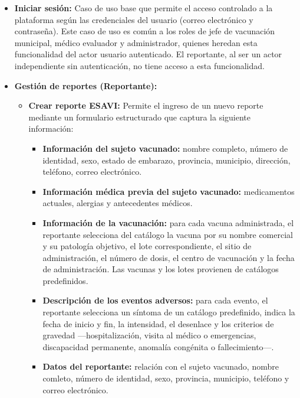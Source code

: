 \begin{itemize} 
    \item \textbf{Iniciar sesión:} Caso de uso base que permite el acceso controlado a la plataforma según las credenciales del usuario (correo electrónico y contraseña). 
    Este caso de uso es común a los roles de jefe de vacunación municipal, médico evaluador y administrador, quienes heredan esta funcionalidad del actor usuario autenticado. 
    El reportante, al ser un actor independiente sin autenticación, no tiene acceso a esta funcionalidad.

    \item \textbf{Gestión de reportes (Reportante):}
        \begin{itemize}
            \item \textbf{Crear reporte ESAVI:} Permite el ingreso de un nuevo reporte mediante un formulario estructurado que captura la siguiente información:
                    
                \begin{itemize}
                    \item \textbf{Información del sujeto vacunado:} nombre completo, número de identidad, sexo, estado de embarazo, provincia, municipio, dirección, teléfono, correo electrónico.
                    \item \textbf{Información médica previa del sujeto vacunado:} medicamentos actuales, alergias y antecedentes médicos.
                    \item \textbf{Información de la vacunación:} para cada vacuna administrada, el reportante selecciona del catálogo la vacuna por su nombre comercial y su patología objetivo, el lote correspondiente, el sitio de administración, el número de dosis, el centro de vacunación y la fecha de administración. Las vacunas y los lotes provienen de catálogos predefinidos.
                    \item \textbf{Descripción de los eventos adversos:} para cada evento, el reportante selecciona un síntoma de un catálogo predefinido, indica la fecha de inicio y fin, la intensidad, el desenlace y los criterios de gravedad —hospitalización, visita al médico o emergencias, discapacidad permanente, anomalía congénita o fallecimiento—.
                    \item \textbf{Datos del reportante:} relación con el sujeto vacunado, nombre comleto, número de identidad, sexo, provincia, municipio, teléfono y correo electrónico.
                \end{itemize}
            

\end{itemize}
\end{itemize}
